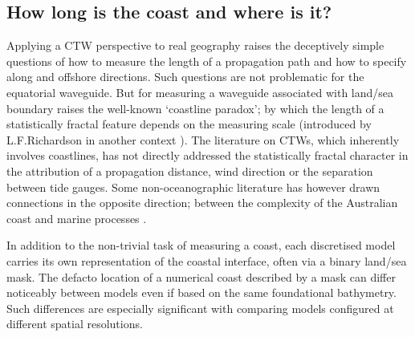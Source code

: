 \subsection{How long is the coast and where is it?}
\label{sec:ctw_waveguide}

Applying a CTW perspective to real geography raises the deceptively simple questions of how to measure the length of a propagation path and how to specify along and offshore directions.
Such questions are not problematic for the equatorial waveguide.
But for measuring a waveguide associated with land/sea boundary  raises the well-known `coastline paradox'; by which the length of a statistically fractal feature depends on the measuring scale \citep{Mandelbrot:1967hr} (introduced by L.F.Richardson in another context \citep{Vulpiani2014}).
The literature on CTWs, which inherently involves coastlines, has not directly addressed the statistically fractal character in the attribution of a propagation distance, wind direction or the separation between tide gauges.
Some non-oceanographic literature has however drawn connections in the opposite direction; between the complexity of the Australian coast and marine processes \citep{10.1016/j.margeo.2012.07.011}.

In addition to the non-trivial task of measuring a coast, each discretised model carries its own representation of the coastal interface, often via a binary land/sea mask.
The defacto location of a numerical coast described by a mask can differ noticeably between models even if based on the same foundational bathymetry.
Such differences are especially significant with comparing models configured at different spatial resolutions. 



